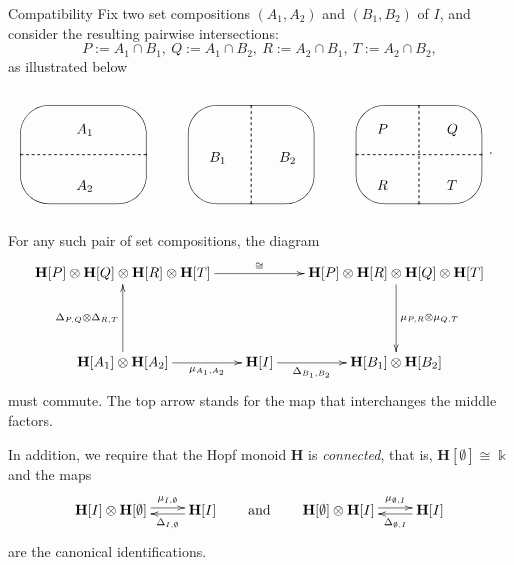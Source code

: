 \documentclass[10pt]{amsart}
\theoremstyle{definition}
\newenvironment{enonce*}[2][]{\par\smallskip\noindent\textbf{#2}.\par\nobreak}{\par\smallskip}
\newenvironment{compatibility}{\begin{enonce*}[remark]{Compatibility}}{\end{enonce*}}
\def\field{\Bbbk}
\newcommand{\bH}{\mathbf{H}}
\newcommand{\qqand}{\qquad\text{and}\qquad}
\begin{document}
\begin{compatibility}
Fix two set compositions $(A_1,A_2)$ and $(B_1,B_2)$ of $I$,
and consider the resulting pairwise intersections:
\[
P:=A_1\cap B_1,\ Q:=A_1\cap B_2,\ R:=A_2\cap B_1,\ T:=A_2\cap B_2,
\]
as illustrated below
\begin{equation}\label{e:4sets}
\begin{gathered}
\quad \begin{picture}(100,90)(20,0)
 \put(50,40){\oval(90,70)}
 \put(5,40){\dashbox{2}(90,0){}}
 \put(45,55){$A_1$}
 \put(45,15){$A_2$}
\end{picture}
\quad
\begin{picture}(100,90)(10,0)
 \put(50,40){\oval(90,70)}
 \put(50,5){\dashbox{2}(0,70){}}
 \put(20,35){$B_1$}
 \put(70,35){$B_2$}
\end{picture}
\quad
\begin{picture}(100,90)(0,0)
\put(50,40){\oval(90,70)}
 \put(5,40){\dashbox{2}(90,0){}}
 \put(50,5){\dashbox{2}(0,70){}}
 \put(20,55){$P$}
 \put(70,55){$Q$}
 \put(20,15){$R$}
 \put(70,15){$T$}
\end{picture}
\end{gathered}.
\end{equation}

For any such pair of set compositions, the diagram
\begin{equation}\label{e:comp}
\begin{gathered}
\xymatrix@R+2pc@C-5pt{
\bH[P] \otimes \bH[Q] \otimes \bH[R] \otimes \bH[T] \ar[rr]^{\cong} & &
\bH[P] \otimes \bH[R] \otimes \bH[Q] \otimes \bH[T] \ar[d]^{\mu_{P,R}
\otimes \mu_{Q,T}}\\
\bH[A_1] \otimes \bH[A_2] \ar[r]_-{\mu_{A_1,A_2}}\ar[u]^{\Delta_{P,Q} \otimes
\Delta_{R,T}} & \bH[I] \ar[r]_-{\Delta_{B_1,B_2}} & \bH[B_1] \otimes
\bH[B_2]
}
\end{gathered}
\end{equation}
must commute. The top arrow stands for the map that interchanges the middle factors.

In addition, we require that the Hopf monoid $\bH$ is \emph{connected}, that is,
 $\bH[\emptyset]\cong\field$ and the maps
\[
\xymatrix{
\bH[I]\otimes\bH[\emptyset] \ar@<0.5ex>[r]^-{\mu_{I,\emptyset}} & 
\bH[I] \ar@<0.5ex>[l]^-{\Delta_{I,\emptyset}} 
}
\qqand
\xymatrix{
\bH[\emptyset]\otimes\bH[I] \ar@<0.5ex>[r]^-{\mu_{\emptyset,I}} & 
\bH[I] \ar@<0.5ex>[l]^-{\Delta_{\emptyset,I}} 
}
\]
are the canonical identifications.


\end{compatibility}
\end{document}
